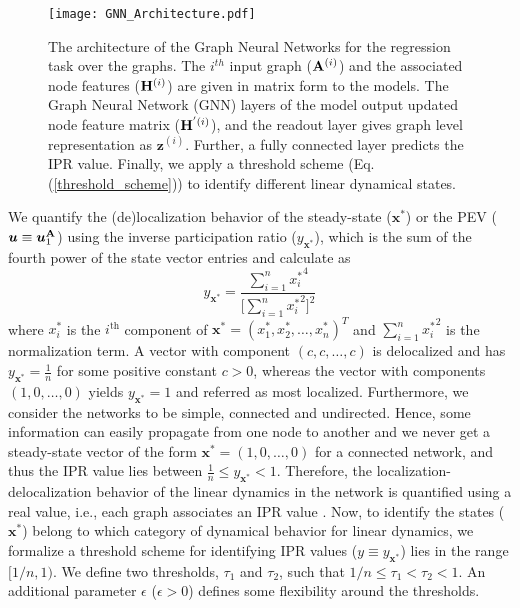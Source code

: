 \documentclass[aps, prd, showpacs, floatfix, superscriptaddress, twocolumn, nofootinbib, preprintnumbers, longbibliography]{revtex4-2}
\begin{document}
\begin{figure*}[tbh]
\begin{center}
\texttt{[image: GNN\_Architecture.pdf]}
\caption{The architecture of the Graph Neural Networks for the regression task over the graphs. The $i^{th}$ input graph (${\bf A }^{(i)}$) and the associated node features (${\bf H}^{(i)}$) are given in matrix form to the models. The Graph Neural Network (GNN) layers of the model output updated node feature matrix (${\bf H}^{'(i)}$), and the readout layer gives graph level representation as $\bm{z}^{(i)}$. Further, a fully connected layer predicts the IPR value. Finally, we apply a threshold scheme (Eq. (\ref{threshold_scheme})) to identify different linear dynamical states.} 
\label{schematic_NN}
\end{center}
\end{figure*}
We quantify the (de)localization behavior of the steady-state ($\bm{x}^{*}$) or the PEV ($\bm{u} \equiv \bm{u}_1^{\bf A}$) using the inverse participation ratio ($y_{\bm{x}^{*}}$), which is the sum of the fourth power of the state vector entries and calculate as \cite{loc2017optimized}
\begin{equation} \label{eq_IPR}
y_{\bm{x}^{*}} = \frac{\sum_{i = 1}^{n} {x^{*}_{i}}^{4}}{\biggl[\sum_{i = 1}^{n} {x^{*}_{i}}^{2}\biggr]^{2}} 
\end{equation}
where $x^{*}_{i}$ is the $i^{\text{th}}$ component of $\bm{x^{*}}=(x^{*}_1,x^{*}_2,\dots,x^{*}_n)^{T}$ and $\sum_{i = 1}^{n} {x^{*}_{i}}^{2}$ is the normalization term. A vector with component $(c,c,\ldots,c)$ is delocalized and has $y_{\bm{x}^{*}} = \frac{1}{n}$ for some positive constant $c>0$, whereas the vector with components $(1, 0, \ldots, 0)$ yields $y_{\bm{x}^{*}} = 1$ and referred as most localized. Furthermore, we consider the networks to be simple, connected and undirected. Hence, some information can easily propagate from one node to another and we never get a steady-state vector of the form $\bm{x}^{*} = (1, 0, \ldots, 0)$ for a connected network, and thus the IPR value lies between $ \frac{1}{n} \leq y_{\bm{x}^{*}} < 1$. Therefore, the localization-delocalization behavior of the linear dynamics in the network is quantified using a real value, i.e., each graph associates an IPR value \cite{pradhan2018network,loc2017optimized, pradhan2020principal, loc2020spectra}. Now, to identify the states ($\bm{x}^{*}$) belong to which category of dynamical behavior for linear dynamics, we formalize a threshold scheme for identifying IPR values ($y \equiv y_{\bm{x}^{*}}$) lies in the range $[1/n, 1)$. We define two thresholds, $\tau_1$ and $\tau_2$, such that $1/n \leq \tau_1 < \tau_2 < 1$. An additional parameter $\epsilon$ ($\epsilon > 0$) defines some flexibility around the thresholds.
\end{document}
